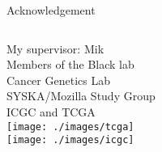 \documentclass[handout]{beamer}
\begin{document}



\begin{frame}{Acknowledgement}
	\begin{columns}
		My supervisor: Mik\\
		Members of the Black lab\\
		Cancer Genetics Lab\\
		SYSKA/Mozilla Study Group\\
		ICGC and TCGA\\
		\texttt{[image: ./images/tcga]}\\
		\texttt{[image: ./images/icgc]}
	\end{columns}
\end{frame}
\end{document}
